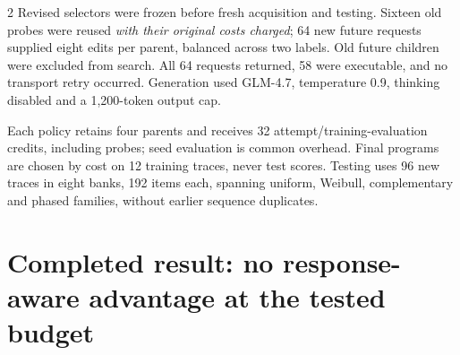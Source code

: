 \documentclass[10pt,letterpaper]{article}
\begin{document}
\begin{multicols}{2}
Revised selectors were frozen before fresh acquisition and testing. Sixteen old probes were reused \emph{with their original costs charged}; 64 new future requests supplied eight edits per parent, balanced across two labels. Old future children were excluded from search. All 64 requests returned, 58 were executable, and no transport retry occurred. Generation used GLM-4.7, temperature 0.9, thinking disabled and a 1,200-token output cap.

Each policy retains four parents and receives 32 attempt/training-evaluation credits, including probes; seed evaluation is common overhead. Final programs are chosen by cost on 12 training traces, never test scores. Testing uses 96 new traces in eight banks, 192 items each, spanning uniform, Weibull, complementary and phased families, without earlier sequence duplicates.
\end{multicols}
\newpage

\section*{Completed result: no response-aware advantage at the tested budget}
\begin{center}

\end{center}
\end{document}

